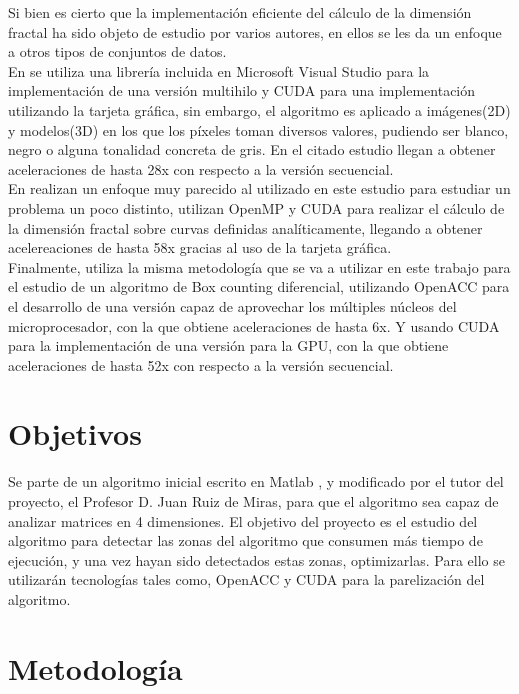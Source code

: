 Si bien es cierto que la implementación eficiente del cálculo de la dimensión fractal ha sido objeto de estudio por varios autores, en ellos se les da un enfoque a otros tipos de conjuntos de datos.\\ En \cite{JIMENEZ20121229} se utiliza una librería incluida en Microsoft Visual Studio para la implementación de una versión multihilo y CUDA para una implementación utilizando la tarjeta gráfica, sin embargo, el algoritmo es aplicado a imágenes(2D) y modelos(3D) en los que los píxeles toman diversos valores, pudiendo ser blanco, negro o alguna tonalidad concreta de gris. En el citado estudio llegan a obtener aceleraciones de hasta 28x con respecto a la versión secuencial. 
\\
En \cite{10.1007/978-3-030-64616-5_8} realizan un enfoque muy parecido al utilizado en este estudio para estudiar un problema un poco distinto, utilizan OpenMP y CUDA para realizar el cálculo de la dimensión fractal sobre curvas definidas analíticamente, llegando a obtener acelereaciones de hasta 58x gracias al uso de la tarjeta gráfica.
\\
Finalmente, \cite{de2020fast} utiliza la misma metodología que se va a utilizar en este trabajo para el estudio de un algoritmo de Box counting diferencial, utilizando OpenACC para el desarrollo de una versión capaz de aprovechar los múltiples núcleos del microprocesador, con la que obtiene aceleraciones de hasta 6x. Y usando CUDA para la implementación de una versión para la GPU, con la que obtiene aceleraciones de hasta 52x con respecto a la versión secuencial.

\section{Objetivos}

Se parte de un algoritmo inicial escrito en Matlab \cite{unknown-author-2008}, y modificado por el tutor del proyecto, el Profesor D. Juan Ruiz de Miras, para que el algoritmo sea capaz de analizar matrices en 4 dimensiones. El objetivo del proyecto es el estudio del algoritmo para detectar las zonas del algoritmo que consumen más tiempo de ejecución, y una vez hayan sido detectados estas zonas, optimizarlas. Para ello se utilizarán tecnologías tales como, OpenACC y CUDA para la parelización del algoritmo.\\

\section{Metodología}

